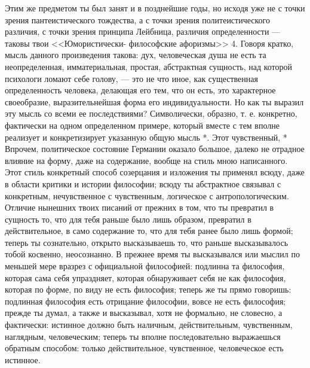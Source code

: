 \documentclass[12pt]{article}
\begin{document}
Этим же предметом ты был занят и в позднейшие 
годы, но исходя уже не с точки зрения  
пантеистического тождества, а с точки зрения политеистического 
различия, с точки зрения принципа Лейбница,  
различия определенности --- таковы твои <<Юмористически- 
философские афоризмы>> 4. Говоря кратко, мысль  
данного произведения такова: дух, человеческая душа не есть та неопределенная, имматериальная, простая,  
абстрактная сущность, над которой психологи ломают 
себе голову, --- это не что иное, как существенная  
определенность человека, делающая его тем, что он есть, это 
характерное своеобразие, выразительнейшая форма его 
индивидуальности. Но как ты выразил эту мысль со 
всеми ее последствиями? Символически, образно, т. е. 
конкретно, фактически на одном определенном  
примере, который вместе с тем вполне реализует и  
конкретизирует указанную общую мысль *. Этот чувственный, 
* Впрочем, политическое состояние Германии оказало 
большое, далеко не отрадное влияние на форму, даже на содержание, вообще на стиль мною написанного. Этот стиль конкретный способ созерцания и изложения ты  
применял всюду, даже в области критики и истории  
философии; всюду ты абстрактное связывал с конкретным, нечувственное с чувственным, логическое с  
антропологическим. Отличие нынешних твоих писаний от прежних 
в том, что ты превратил в сущность то, что для тебя 
раньше было лишь образом, превратил в  
действительное, в само содержание то, что для тебя ранее было 
лишь формой; теперь ты сознательно, открыто  
высказываешь то, что раньше высказывалось тобой  
косвенно, неосознанно. В прежнее время ты высказывался или 
мыслил по меньшей мере вразрез с официальной  
философией: подлинна та философия, которая сама себя 
упраздняет, которая обнаруживает себя не как  
философия, которая по форме, по виду не есть философия; 
теперь же ты прямо говоришь: подлинная философия 
есть отрицание философии, вовсе не есть философия; 
прежде ты думал, а также и высказывал, хотя не  
формально, не словесно, а фактически: истинное должно 
быть наличным, действительным, чувственным,  
наглядным, человеческим; теперь ты вполне последовательно 
выражаешься обратным способом: только  
действительное, чувственное, человеческое есть истинное.
\end{document}
